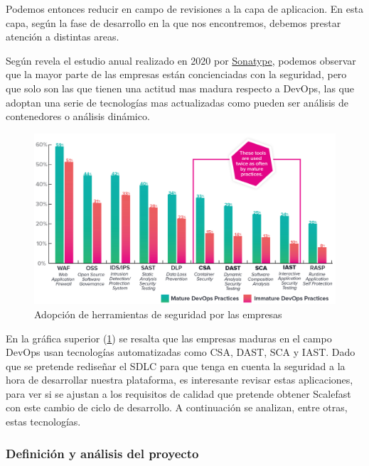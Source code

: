 \documentclass[12pt]{report} %
\begin{document}
Podemos entonces reducir en campo de revisiones a la capa de aplicacion.  En
esta capa, según la fase de desarrollo en la que nos encontremos, debemos
prestar atención a distintas areas.

Según revela el estudio anual \nocite{sonatype2020} realizado en 2020 por
\href{https://sonatype.com}{Sonatype}, podemos observar que la mayor parte de
las empresas están concienciadas con la seguridad, pero que solo son las que
tienen una actitud mas madura respecto a DevOps, las que adoptan una serie de
tecnologías mas actualizadas como pueden ser análisis de contenedores o
análisis dinámico.

\begin{figure}[H] 
  \includegraphics[width=\textwidth]{sonatype-tools}
  \caption{Adopción de herramientas de seguridad por las empresas}
  \label{fig:sonatype-tools}
\end{figure}

En la gráfica superior (\ref{fig:sonatype-tools}) se resalta que las empresas
maduras en el campo DevOps usan tecnologías automatizadas como \gls{CSA},
\gls{DAST}, \gls{SCA} y \gls{IAST}.  
Dado que se pretende rediseñar el \gls{SDLC} para que tenga en
cuenta la seguridad a la hora de desarrollar nuestra plataforma, es interesante
revisar estas aplicaciones, para ver si se ajustan a los requisitos de calidad
que pretende obtener Scalefast con este cambio de ciclo de desarrollo.
A continuación se analizan, entre otras, estas tecnologías.

\subsubsection{Definición y análisis del proyecto} \label{definicionyanalisis}
\end{document}
